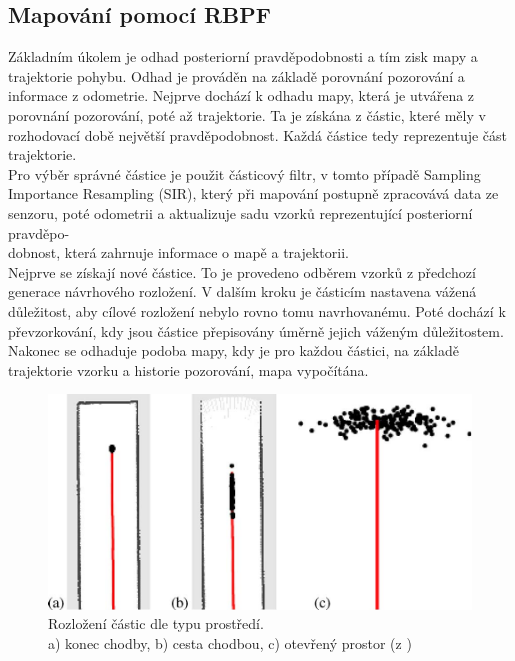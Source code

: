 \documentclass[12pt]{report}
\begin{document}
\subsection{Mapování pomocí RBPF}
Základním úkolem je odhad posteriorní pravděpodobnosti a tím zisk mapy a trajektorie pohybu. Odhad je prováděn na základě porovnání pozorování a informace z odometrie. Nejprve dochází k odhadu mapy, která je utvářena z porovnání pozorování, poté až trajektorie. Ta je získána z částic, které měly v rozhodovací době největší pravděpodobnost. Každá částice tedy reprezentuje část trajektorie.\\
\indent Pro výběr správné částice je použit částicový filtr, v tomto případě Sampling Importance Resampling (SIR), který při mapování postupně zpracovává data ze senzoru, poté odometrii a aktualizuje sadu vzorků reprezentující posteriorní pravděpo-\\dobnost, která zahrnuje informace o mapě a trajektorii. \\
\indent Nejprve se získají nové částice. To je provedeno odběrem vzorků z předchozí generace návrhového rozložení. V dalším kroku je částicím nastavena vážená důležitost, aby cílové rozložení nebylo rovno tomu navrhovanému. Poté dochází k převzorkování, kdy jsou částice přepisovány úměrně jejich váženým důležitostem. Nakonec se odhaduje podoba mapy, kdy je pro každou částici, na základě trajektorie vzorku a historie pozorování, mapa vypočítána.

\begin{figure}[!ht]
	\begin{center}
		\includegraphics[width=0.7\columnwidth]{imgs/gmapping_particles.pdf}
	\end{center}
	\caption{Rozložení částic dle typu prostředí.\\
	a) konec chodby, b) cesta chodbou, c) otevřený prostor (z \cite{Kohlbrecher2011})}
	\label{fig:gmapping_particles}
\end{figure}
\end{document}
